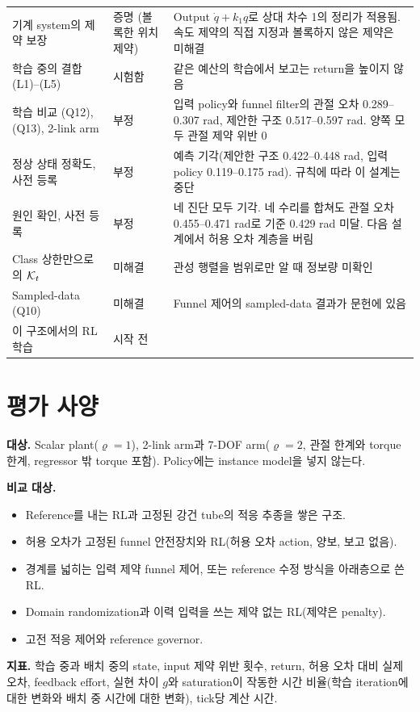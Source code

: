 \documentclass[11pt]{article}\usepackage[margin=1in]{geometry}\usepackage{amsmath,amssymb,amsthm,mathtools}\usepackage{graphicx}\graphicspath{{figures/}{../figures/}{figs/}{./}}\usepackage{enumitem}\usepackage{hyperref}\usepackage{cleveref}\usepackage{tikz}\usetikzlibrary{arrows.meta,positioning,calc,shapes.geometric}\usepackage{float}\usepackage{rotating}\usepackage[most]{tcolorbox}\usepackage{kotex}\usepackage{booktabs}\emergencystretch=1.6em\tolerance=2000 \crefname{assumption}{Assumption}{Assumptions}\Crefname{assumption}{Assumption}{Assumptions}\crefname{definition}{Definition}{Definitions}\Crefname{definition}{Definition}{Definitions}\crefname{proposition}{Proposition}{Propositions}\Crefname{proposition}{Proposition}{Propositions}\crefname{fact}{Fact}{Facts}\Crefname{fact}{Fact}{Facts} \newtheorem{assumption}{Assumption}\newtheorem{definition}{Definition}\newtheorem{lemma}{Lemma}\newtheorem{proposition}{Proposition}\newtheorem{theorem}{Theorem}\newtheorem{corollary}{Corollary}\newtheorem{fact}{Fact}\theoremstyle{remark}\newtheorem{remark}{Remark} \newcommand{\R}{\mathbb{R}}\newcommand{\xb}{\bar x}\newcommand{\Ab}{\bar A}\newcommand{\By}{\bar B_y}\newcommand{\U}{\mathcal U}\newcommand{\Z}{\mathcal Z}
\begin{document}
\begin{table}[H]
\begin{tabular}{p{4.6cm}p{2.3cm}p{7.5cm}}
기계 system의 제약 보장 & 증명 (볼록한 위치 제약) & Output $\dot q+k_1q$로 상대 차수 1의 정리가 적용됨. 속도 제약의 직접 지정과 볼록하지 않은 제약은 미해결 \\
학습 중의 결합 (L1)--(L5) & 시험함 & 같은 예산의 학습에서 보고는 return을 높이지 않음 \\
학습 비교 (Q12), (Q13), 2-link arm & 부정 & 입력 policy와 funnel filter의 관절 오차 0.289--0.307 rad, 제안한 구조 0.517--0.597 rad. 양쪽 모두 관절 제약 위반 0 \\
정상 상태 정확도, 사전 등록 & 부정 & 예측 기각(제안한 구조 0.422--0.448 rad, 입력 policy 0.119--0.175 rad). 규칙에 따라 이 설계는 중단 \\
원인 확인, 사전 등록 & 부정 & 네 진단 모두 기각. 네 수리를 합쳐도 관절 오차 0.455--0.471 rad로 기준 0.429 rad 미달. 다음 설계에서 허용 오차 계층을 버림 \\
Class 상한만으로의 $\mathcal K_t$ & 미해결 & 관성 행렬을 범위로만 알 때 정보량 미확인 \\
Sampled-data (Q10) & 미해결 & Funnel 제어의 sampled-data 결과가 문헌에 있음 \\
이 구조에서의 RL 학습 & 시작 전 & \\
\bottomrule
\end{tabular}
\end{table}

\section{평가 사양}
\label{sec:eval}

\textbf{대상.} Scalar plant($\varrho=1$), 2-link arm과 7-DOF arm($\varrho=2$, 관절 한계와 torque 한계, regressor 밖 torque 포함). Policy에는 instance model을 넣지 않는다.

\textbf{비교 대상.}
\begin{itemize}
\item Reference를 내는 RL과 고정된 강건 tube의 적응 추종을 쌓은 구조.
\item 허용 오차가 고정된 funnel 안전장치와 RL(허용 오차 action, 양보, 보고 없음).
\item 경계를 넓히는 입력 제약 funnel 제어, 또는 reference 수정 방식을 아래층으로 쓴 RL.
\item Domain randomization과 이력 입력을 쓰는 제약 없는 RL(제약은 penalty).
\item 고전 적응 제어와 reference governor.
\end{itemize}

\textbf{지표.} 학습 중과 배치 중의 state, input 제약 위반 횟수, return, 허용 오차 대비 실제 오차, feedback effort, 실현 차이 $g$와 saturation이 작동한 시간 비율(학습 iteration에 대한 변화와 배치 중 시간에 대한 변화), tick당 계산 시간.
\end{document}
